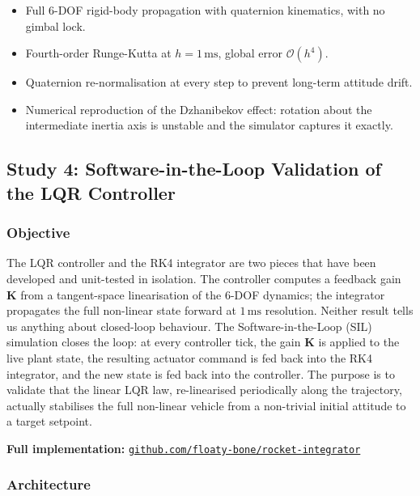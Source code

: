 \documentclass[11pt,a4paper]{article}
\begin{document}
\begin{tcolorbox}[colback=accentcolor!10,colframe=accentcolor,title=Key Outcomes]
\begin{itemize}[leftmargin=*]
    \item Full 6-DOF rigid-body propagation with quaternion kinematics, with no gimbal lock.
    \item Fourth-order Runge-Kutta at $h = 1\,\text{ms}$, global error $\mathcal{O}(h^4)$.
    \item Quaternion re-normalisation at every step to prevent long-term attitude drift.
    \item Numerical reproduction of the Dzhanibekov effect: rotation about the intermediate inertia axis is unstable and the simulator captures it exactly.
\end{itemize}
\end{tcolorbox}

\newpage


\subsection{Study 4: Software-in-the-Loop Validation of the LQR Controller}

\subsubsection{Objective}

The LQR controller and the RK4 integrator are two pieces that have been developed and unit-tested in isolation. The controller computes a feedback gain $\mathbf{K}$ from a tangent-space linearisation of the 6-DOF dynamics; the integrator propagates the full non-linear state forward at $1\,\text{ms}$ resolution. Neither result tells us anything about closed-loop behaviour. The Software-in-the-Loop (SIL) simulation closes the loop: at every controller tick, the gain $\mathbf{K}$ is applied to the live plant state, the resulting actuator command is fed back into the RK4 integrator, and the new state is fed back into the controller. The purpose is to validate that the linear LQR law, re-linearised periodically along the trajectory, actually stabilises the full non-linear vehicle from a non-trivial initial attitude to a target setpoint.

\medskip
\noindent\textbf{Full implementation:} \href{https://github.com/floaty-bone/rocket-integrator}{\texttt{github.com/floaty-bone/rocket-integrator}}

\subsubsection{Architecture}
\end{document}
